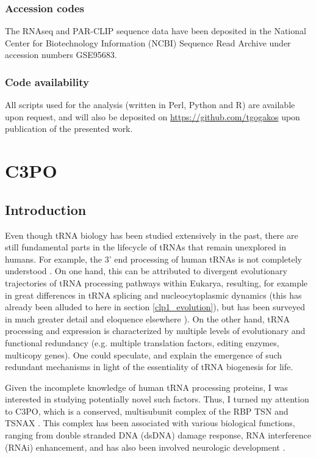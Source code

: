 \documentclass[12pt]{rockefeller}
\begin{document}
\section{Accession codes}
The RNAseq and PAR-CLIP sequence data have been deposited in the National Center for Biotechnology Information (NCBI) Sequence Read Archive under accession numbers GSE95683.

\section{Code availability}
All scripts used for the analysis (written in Perl, Python and R) are available upon request, and will also be deposited on \url{https://github.com/tgogakos} upon publication of the presented work.  

\part{C3PO}
\chapter{Introduction}
Even though tRNA biology has been studied extensively in the past, there are still fundamental parts in the lifecycle of tRNAs that remain unexplored in humans. For example, the 3' end processing of human tRNAs is not completely understood \cite{Maraia:2010kx}. On one hand, this can be attributed to divergent evolutionary trajectories of tRNA processing pathways within Eukarya, resulting, for example in great differences in tRNA splicing and nucleocytoplasmic dynamics (this has already been alluded to here in section \ref{clp1_evolution}), but has been surveyed in much greater detail and eloquence elsewhere \cite{Hopper:2008ct, Hopper:2010ho, Phizicky:2010jf}). On the other hand, tRNA processing and expression is characterized by multiple levels of evolutionary and functional redundancy (e.g. multiple translation factors, editing enzymes, multicopy genes). One could speculate, and explain the emergence of such redundant mechanisms in light of the essentiality of tRNA biogenesis for life. 

Given the incomplete knowledge of human tRNA processing proteins, I was interested in studying potentially novel such factors. Thus, I turned my attention to \gls{C3PO}, which is a conserved, multisubunit complex of the RBP \gls{TSN} and \gls{TSNAX} \cite{Liu:2009ce}. This complex has been associated with various biological functions, ranging from double stranded DNA (dsDNA) damage response, RNA interference (RNAi) enhancement, and has also been involved neurologic development \cite{Aoki:1995ec, Ishida:2002td, Stein:2006jj, Claussen:2006in, Liu:2009ce}. 
	
\end{document}
